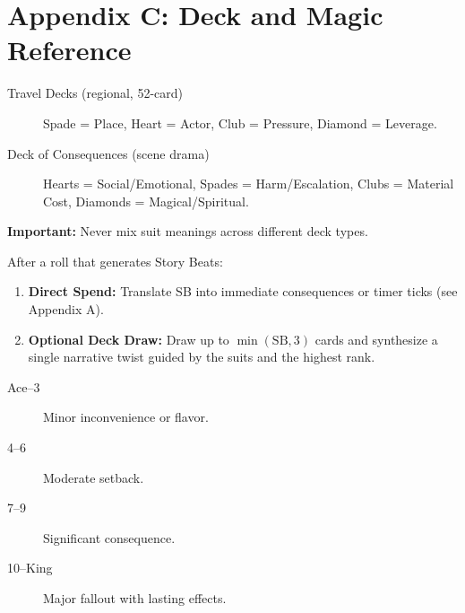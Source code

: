 \clearpage
\section*{Appendix C: Deck and Magic Reference}
\label{app:deck-magic}

\begin{tcolorbox}[title=Deck Types and Meanings, colback=white!97!gray, colframe=black!80!gray,breakable]
\begin{description}
  \item[Travel Decks (regional, 52-card)] Spade = Place, Heart = Actor, Club = Pressure, Diamond = Leverage.
  \item[Deck of Consequences (scene drama)] Hearts = Social/Emotional, Spades = Harm/Escalation, Clubs = Material Cost, Diamonds = Magical/Spiritual.
\end{description}
\textbf{Important:} Never mix suit meanings across different deck types.
\end{tcolorbox}

\begin{tcolorbox}[title=Deck Usage Procedure, colback=white!97!gray, colframe=black!80!gray,breakable]
After a roll that generates Story Beats:
\begin{enumerate}
  \item \textbf{Direct Spend:} Translate SB into immediate consequences or timer ticks (see Appendix A).
  \item \textbf{Optional Deck Draw:} Draw up to \(\min(\text{SB},3)\) cards and synthesize a single narrative twist guided by the suits and the highest rank.
\end{enumerate}
\end{tcolorbox}

\begin{tcolorbox}[title=Rank Severity Guide, colback=white!97!gray, colframe=black!80!gray,breakable]
\begin{description}
  \item[Ace--3] Minor inconvenience or flavor.
  \item[4--6] Moderate setback.
  \item[7--9] Significant consequence.
  \item[10--King] Major fallout with lasting effects.
\end{description}
\end{tcolorbox}

